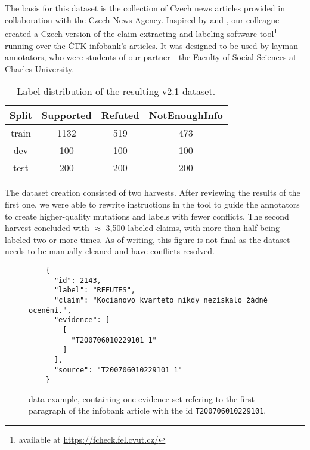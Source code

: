 \section{\CTK}

The basis for this dataset is the collection of Czech news articles provided in collaboration with the Czech News Agency. 
Inspired by \cite{fever} and \cite{danish_fever}, our colleague \cite{ullrich} created a Czech version of the claim extracting and labeling software tool\footnote{available at \url{https://fcheck.fel.cvut.cz/}} running over the ČTK infobank's articles. 
It was designed to be used by layman annotators, who were students of our partner - the Faculty of Social Sciences at Charles University.

\begin{table}[h!]
\centering
\begin{tabular}{c || c c c}
    Split & Supported & Refuted & NotEnoughInfo \\
    \hline
    train & 1132 & 519 & 473 \\
    dev & 100 & 100 & 100 \\
    test & 200 & 200 & 200
\end{tabular}
\caption{Label distribution of the resulting \CTK{} v2.1 dataset.}
\end{table}

The dataset creation consisted of two harvests. 
After reviewing the results of the first one, we were able to rewrite instructions in the tool to guide the annotators to create higher-quality mutations and labels with fewer conflicts.
The second harvest concluded with $\approx$ 3,500 labeled claims, with more than half being labeled two or more times. %
As of writing, this figure is not final as the dataset needs to be manually cleaned and have conflicts resolved. 

\begin{figure}[h!]
    \begin{framed}
    \begin{verbatim}
    {
      "id": 2143,
      "label": "REFUTES",
      "claim": "Kocianovo kvarteto nikdy nezískalo žádné ocenění.",
      "evidence": [
        [
          "T200706010229101_1"
        ]
      ],
      "source": "T200706010229101_1"
    }\end{verbatim}
    \vspace{-0.4cm}
    \end{framed}
    \caption{\CTK{} data example, containing one evidence set refering to the first paragraph of the \CTK{} infobank article with the id \texttt{T200706010229101}.}
    \label{fig:ctk_example}
\end{figure}

